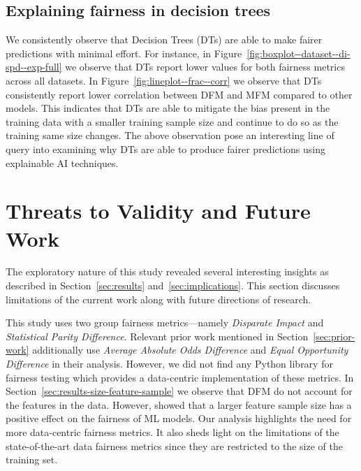 \documentclass[sigconf,review,anonymous]{acmart}
\begin{document}
\subsection{Explaining fairness in decision trees}\label{sec:discuss-explain-fair-dt}


We consistently observe that Decision Trees (DTs) are able to make
fairer predictions with minimal effort. For instance, in
Figure \ref{fig:boxplot--dataset--di-spd--exp-full} we observe that
DTs report lower values for both fairness metrics across all
datasets. In Figure \ref{fig:lineplot--frac--corr} we observe that DTs
consistently report lower correlation between DFM and MFM compared to
other models. This indicates that DTs are able to mitigate the bias
present in the training data with a smaller training sample size and
continue to do so as the training same size changes. The above
observation pose an interesting line of query into examining why DTs
are able to produce fairer predictions using explainable AI
techniques.

\section{Threats to Validity and Future Work}\label{sec:threats}
The exploratory nature of this study revealed several interesting
insights as described in Section \ref{sec:results}
and \ref{sec:implications}. This section discusses limitations of the
current work along with future directions of research.



This study uses two group fairness metrics---namely \emph{Disparate
Impact} and \emph{Statistical Parity Difference}. Relevant prior work
mentioned in Section \ref{sec:prior-work} additionally use
\emph{Average Absolute Odds Difference} and \emph{Equal Opportunity
Difference} in their analysis. However, we did not find any Python
library for fairness testing which provides a data-centric
implementation of these metrics. In
Section \ref{sec:results-size-feature-sample} we observe that DFM do
not account for the features in the data. However,
\citeauthor{zhang2021ignorance} showed that a larger feature sample
size has a positive effect on the fairness of ML models. Our analysis
highlights the need for more data-centric fairness metrics. It also
sheds light on the limitations of the state-of-the-art data fairness
metrics since they are restricted to the size of the training set.
\end{document}
